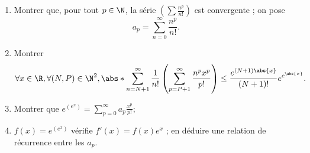 \begin{enonce}
\begin{exercise}[ID={cahierRMS 5, 126, Centrale},subtitle={},tags={}, difficulty={0}]
\begin{enumerate}
\item
  Montrer que, pour tout $p\in\N$, la série $\left( \sum\frac{n^p}{n!} \right)$ est convergente ; on pose
  \begin{equation*}
    a_p = \sum_{n=0}^\infty \frac{n^p}{n!}.
  \end{equation*}
\item Montrer
  \begin{equation*}
    \forall x\in\R, \forall(N,P)\in\N^2, 
    \abs*{\sum_{n=N+1}^{\infty} \frac 1{n!} \left( \sum_{p=P+1}^{\infty} \frac{n^px^p}{p!} \right)}
    \leq 
    \frac{e^{(N+1)\abs{x}}}{(N+1)!} e^{e^{\abs{x}}}.
  \end{equation*}
\item Montrer que $e^{\left( e^x \right)} = \sum_{p=0}^{\infty} a_p \frac{x^p}{p!}$;
\item $f(x) = e^{\left( e^x \right)}$ vérifie $f'(x) = f(x) e^x$ ; en déduire une relation de récurrence entre les $a_p$.
\end{enumerate}
\end{exercise}
\begin{solution}
\end{solution}
\end{enonce}

